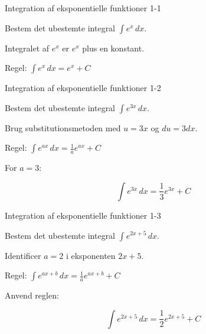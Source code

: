 \documentclass{article}
\begin{document}

\tableofcontents
\newpage

\begin{exercise}{Integration af eksponentielle funktioner 1-1}

Bestem det ubestemte integral $\int e^x \, dx$.


\hint

Integralet af $e^x$ er $e^x$ plus en konstant.

\hint

Regel: $\int e^x \, dx = e^x + C$

\end{exercise}

\newpage

\begin{exercise}{Integration af eksponentielle funktioner 1-2}

Bestem det ubestemte integral $\int e^{3x} \, dx$.


\hint

Brug substitutionsmetoden med $u = 3x$ og $du = 3 dx$.

\hint

Regel: $\int e^{ax} \, dx = \frac{1}{a}e^{ax} + C$

\hint

For $a = 3$:

\hint
\[
\int e^{3x} \, dx = \frac{1}{3}e^{3x} + C
\]

\end{exercise}

\newpage

\begin{exercise}{Integration af eksponentielle funktioner 1-3}

Bestem det ubestemte integral $\int e^{2x + 5} \, dx$.


\hint

Identificer $a = 2$ i eksponenten $2x + 5$.

\hint

Regel: $\int e^{ax + b} \, dx = \frac{1}{a}e^{ax + b} + C$

\hint

Anvend reglen:

\hint
\[
\int e^{2x + 5} \, dx = \frac{1}{2}e^{2x + 5} + C
\]

\end{exercise}
\end{document}

